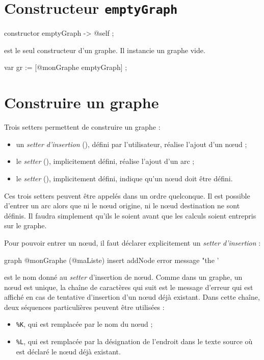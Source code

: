 \section{Constructeur \texttt{emptyGraph}}

\begin{galgascode}
constructor emptyGraph -> @self ;
\end{galgascode}

 est le seul constructeur d'un graphe. Il instancie un graphe vide.

\begin{galgascode}
var gr := [@monGraphe emptyGraph] ;
\end{galgascode}



\section{Construire un graphe}

Trois setters permettent de construire un graphe :
\begin{itemize}
  \item un \emph{setter d'insertion} (), défini par l'utilisateur, réalise l'ajout d'un nœud ;
  \item le \emph{setter}  (), implicitement défini, réalise l'ajout d'un arc ;
  \item le \emph{setter}  (), implicitement défini, indique qu'un nœud doit être défini.
\end{itemize}

Ces trois setters peuvent être appelés dans un ordre quelconque. Il est possible d'entrer un arc alors que ni le nœud origine, ni le nœud destination ne sont définis. Il faudra simplement qu'ils le soient avant que les calculs soient entrepris sur le graphe.


Pour pouvoir entrer un nœud, il faut déclarer explicitement un \emph{setter d'insertion} :
\begin{galgascode}
graph @monGraphe (@maListe) {
  insert addNode error message "the '%
}
\end{galgascode}

 est le nom donné au \emph{setter} d'insertion de nœud. Comme dans un graphe, un nœud est unique, la chaîne de caractères qui suit  est le message d'erreur qui est affiché en cas de tentative d'insertion d'un nœud déjà existant. Dans cette chaîne, deux séquences particulières peuvent être utilisées :
\begin{itemize}
  \item \colorbox{\couleurCodeGALGAS}{\texttt{\%K}}, qui est remplacée par le nom du nœud ;
  \item \colorbox{\couleurCodeGALGAS}{\texttt{\%L}}, qui est remplacée par la désignation de l'endroit dans le texte source où est déclaré le nœud déjà existant.
\end{itemize}

